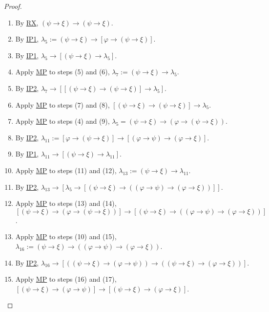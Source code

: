 \documentclass{treatise}
\begin{document}
\begin{proof}
\begin{enumerate}
    \\
    \item By \hyperref[HPL-T-RX]{RX}, $(\psi \to \xi) \to (\psi \to \xi)$.
    \\
    \item By \hyperref[HPL-A-IP1]{IP1}, $\lambda_5 := (\psi \to \xi) \to [\varphi \to (\psi \to \xi)]$.
    \item By \hyperref[HPL-A-IP1]{IP1}, $\lambda_5 \to [(\psi \to \xi) \to \lambda_5]$.
    \item Apply \hyperref[HPL-R-MP]{MP} to steps (5) and (6), $\lambda_7 := (\psi \to \xi) \to \lambda_5$.
    \\
    \item By \hyperref[HPL-A-IP2]{IP2}, $\lambda_7 \to [[(\psi \to \xi) \to (\psi \to \xi)] \to \lambda_5]$.
    \item Apply \hyperref[HPL-R-MP]{MP} to steps (7) and (8), $[(\psi \to \xi) \to (\psi \to \xi)] \to \lambda_5$.
    \item Apply \hyperref[HPL-R-MP]{MP} to steps (4) and (9), $\lambda_5 = (\psi \to \xi) \to (\varphi \to (\psi \to \xi))$.
    \\
    \item By \hyperref[HPL-A-IP2]{IP2}, $\lambda_{11} := [\varphi \to (\psi \to \xi)] \to [(\varphi \to \psi) \to (\varphi \to \xi)]$.
    \item By \hyperref[HPL-A-IP2]{IP1}, $\lambda_{11} \to [(\psi \to \xi) \to \lambda_{11}]$.
    \item Apply \hyperref[HPL-R-MP]{MP} to steps (11) and (12), $\lambda_{13} := (\psi \to \xi) \to \lambda_{11}$.
    \\
    \item By \hyperref[HPL-A-IP2]{IP2}, $\lambda_{13} \to [\lambda_5 \to [(\psi \to \xi) \to ((\varphi \to \psi) \to (\varphi \to \xi))]]$.
    \item Apply \hyperref[HPL-R-MP]{MP} to steps (13) and (14), $[(\psi \to \xi) \to (\varphi \to (\psi \to \xi))] \to [(\psi \to \xi) \to ((\varphi \to \psi) \to (\varphi \to \xi))]$.
    \item Apply \hyperref[HPL-R-MP]{MP} to steps (10) and (15), $\lambda_{16} := (\psi \to \xi) \to ((\varphi \to \psi) \to (\varphi \to \xi))$.
    \\
    \item By \hyperref[HPL-A-IP2]{IP2}, $\lambda_{16} \to [((\psi \to \xi) \to (\varphi \to \psi)) \to ((\psi \to \xi) \to (\varphi \to \xi))]$.
    \item Apply \hyperref[HPL-R-MP]{MP} to steps (16) and (17), $[(\psi \to \xi) \to (\varphi \to \psi)] \to [(\psi \to \xi) \to (\varphi \to \xi)]$.

\end{enumerate}
\end{proof}
\end{document}
